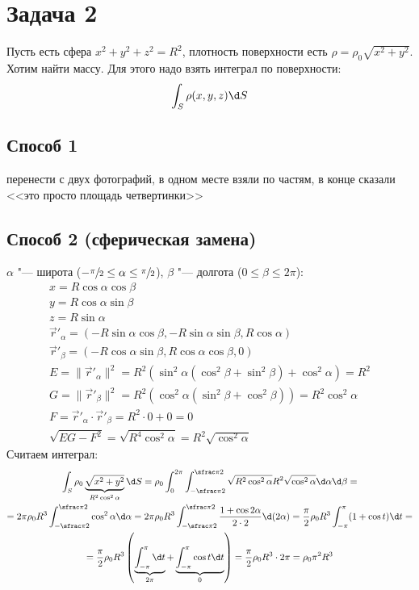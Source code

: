 \section{Задача 2}
Пусть есть сфера $x^2+y^2+z^2=R^2$, плотность поверхности есть $\rho = \rho_0 \sqrt{x^2+y^2}$.
Хотим найти массу.
Для этого надо взять интеграл по поверхности:
\[ \int_S \rho(x, y, z) \d S \]

\subsection{Способ 1}
\TODO перенести с двух фотографий, в одном месте взяли по частям, в конце сказали <<это просто площадь четвертинки>>

\subsection{Способ 2 (сферическая замена)}
$\alpha$ "--- широта ($-\sfrac \pi 2 \le \alpha \le \sfrac \pi 2$), $\beta$ "--- долгота ($0 \le \beta \le 2\pi$):
\begin{gather*}
	x = R \cos \alpha \cos \beta \\
	y = R \cos \alpha \sin \beta \\
	z = R \sin \alpha \\
	\vec r'_\alpha = (-R \sin \alpha \cos \beta, -R \sin\alpha \sin\beta, R \cos \alpha) \\
	\vec r'_\beta  = (-R \cos \alpha \sin \beta, R \cos\alpha \cos\beta, 0) \\
	E = \|\vec r'_\alpha\|^2 = R^2(\sin^2\alpha(\cos^2\beta + \sin^2\beta)+\cos^2\alpha) = R^2\\
	G = \|\vec r'_\beta\|^2 = R^2(\cos^2\alpha(\sin^2\beta+\cos^2\beta)) = R^2\cos^2\alpha \\
	F = \vec r'_\alpha \cdot \vec r'_\beta = R^2 \cdot 0 + 0 = 0 \\
	\sqrt{EG-F^2} = \sqrt{R^4\cos^2\alpha} = R^2\sqrt{\cos^2\alpha}
\end{gather*}
Считаем интеграл:
\begin{gather*}
	\int_S \rho_0 \underbrace{\sqrt{x^2+y^2}}_{R^2\cos^2\alpha} \d S =
	\rho_0 \int_0^{2\pi} \int_{-\sfrac \pi 2}^{\sfrac \pi 2} \sqrt{R^2\cos^2\alpha} R^2 \sqrt{\cos^2\alpha} \d \alpha \d \beta = \\
	= 2\pi \rho_0 R^3 \int_{-\sfrac \pi 2}^{\sfrac \pi 2} \cos^2\alpha \d \alpha =
	2\pi \rho_0 R^3 \int_{-\sfrac \pi 2}^{\sfrac \pi 2} \frac{1 + \cos 2\alpha}{2 \cdot 2} \d (2 \alpha) =
	\frac{\pi}{2} \rho_0 R^3 \int_{-\pi}^{\pi} (1 + \cos t) \d t = \\
	= \frac{\pi}{2} \rho_0 R^3 \left( \underbrace{\int_{-\pi}^{\pi} \d t}_{2\pi} + \underbrace{\int_{-\pi}^{\pi} \cos t \d t}_{0} \right) =
	\frac{\pi}{2} \rho_0 R^3 \cdot 2\pi =
	\rho_0 \pi^2 R^3
\end{gather*}

